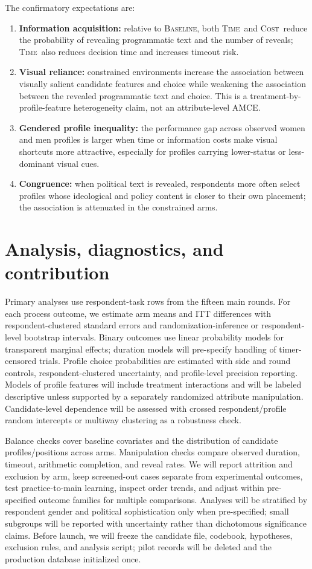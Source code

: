 \documentclass[10pt]{article}
\newcommand{\armT}{\textsc{Time}}
\newcommand{\armC}{\textsc{Cost}}
\newcommand{\armB}{\textsc{Baseline}}
\begin{document}
The confirmatory expectations are:
\begin{enumerate}
\item \textbf{Information acquisition:} relative to \armB, both \armT\ and \armC\ reduce the probability of revealing programmatic text and the number of reveals; \armT\ also reduces decision time and increases timeout risk.
\item \textbf{Visual reliance:} constrained environments increase the association between visually salient candidate features and choice while weakening the association between the revealed programmatic text and choice. This is a treatment-by-profile-feature heterogeneity claim, not an attribute-level AMCE.
\item \textbf{Gendered profile inequality:} the performance gap across observed women and men profiles is larger when time or information costs make visual shortcuts more attractive, especially for profiles carrying lower-status or less-dominant visual cues.
\item \textbf{Congruence:} when political text is revealed, respondents more often select profiles whose ideological and policy content is closer to their own placement; the association is attenuated in the constrained arms.
\end{enumerate}

\section{Analysis, diagnostics, and contribution}

Primary analyses use respondent-task rows from the fifteen main rounds. For each process outcome, we estimate arm means and ITT differences with respondent-clustered standard errors and randomization-inference or respondent-level bootstrap intervals. Binary outcomes use linear probability models for transparent marginal effects; duration models will pre-specify handling of timer-censored trials. Profile choice probabilities are estimated with side and round controls, respondent-clustered uncertainty, and profile-level precision reporting. Models of profile features will include treatment interactions and will be labeled descriptive unless supported by a separately randomized attribute manipulation. Candidate-level dependence will be assessed with crossed respondent/profile random intercepts or multiway clustering as a robustness check.

Balance checks cover baseline covariates and the distribution of candidate profiles/positions across arms. Manipulation checks compare observed duration, timeout, arithmetic completion, and reveal rates. We will report attrition and exclusion by arm, keep screened-out cases separate from experimental outcomes, test practice-to-main learning, inspect order trends, and adjust within pre-specified outcome families for multiple comparisons. Analyses will be stratified by respondent gender and political sophistication only when pre-specified; small subgroups will be reported with uncertainty rather than dichotomous significance claims. Before launch, we will freeze the candidate file, codebook, hypotheses, exclusion rules, and analysis script; pilot records will be deleted and the production database initialized once.
\end{document}
